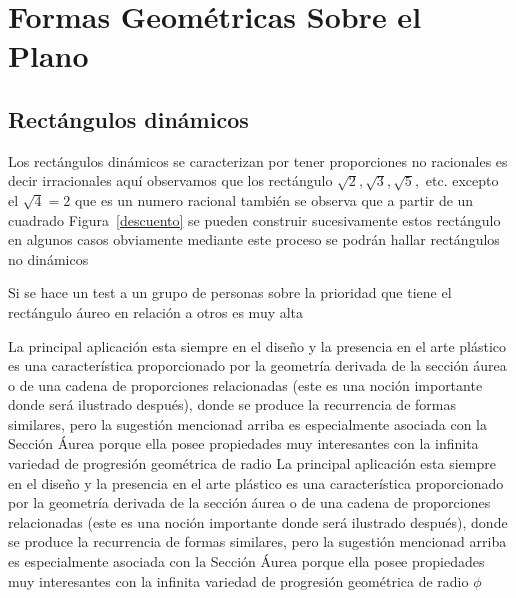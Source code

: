 
\chapter{Formas Geométricas Sobre el Plano}

\section{Rectángulos dinámicos}


Los rectángulos dinámicos se caracterizan por  tener proporciones no racionales es decir irracionales aquí observamos que los rectángulo $\sqrt{2},\sqrt{3}, \sqrt{5},$ etc. excepto el $\sqrt{4}=2$ que es un numero racional también se observa que a partir de un cuadrado Figura~\ref{descuento} se pueden construir sucesivamente estos rectángulo en algunos  casos obviamente mediante este proceso se podrán hallar rectángulos  no dinámicos

Si se hace un test a un grupo de personas sobre la prioridad que tiene el rectángulo áureo en relación  a otros es muy alta



La principal aplicación esta siempre en el diseño y la presencia en el arte plástico es una característica proporcionado por la geometría derivada de la sección áurea o de una cadena de proporciones relacionadas (este es una noción importante donde será ilustrado después), donde se produce la recurrencia de formas similares, pero la sugestión mencionad arriba es especialmente asociada con la Sección Áurea porque ella posee propiedades muy interesantes con la infinita variedad de progresión geométrica de radio
La principal aplicación esta siempre en el diseño y la presencia en el arte plástico es una característica proporcionado por la geometría derivada de la sección áurea o de una cadena de proporciones relacionadas (este es una noción importante donde será ilustrado después), donde se produce la recurrencia de formas similares, pero la sugestión mencionad arriba es especialmente asociada con la Sección Áurea porque ella posee propiedades muy interesantes con la infinita variedad de progresión geométrica de radio $\phi$


